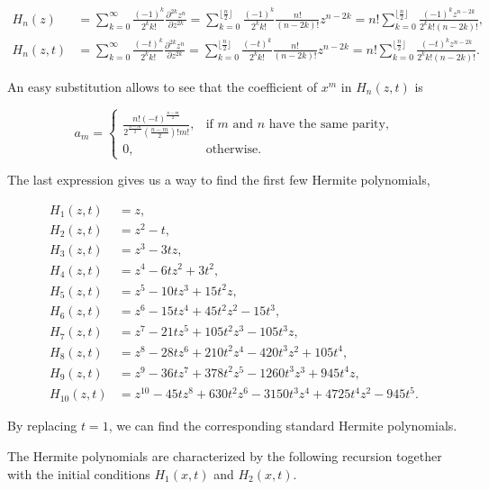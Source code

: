 \begin{align*}
    H_n(z) &= \sum_{k=0}^\infty \frac{(-1)^k}{2^k k!} \frac{\partial^{2k} z^n}{\partial z^{2k}} = \sum_{k=0}^{\lfloor \frac n2 \rfloor} \frac{(-1)^k}{2^k k!} \frac{n! }{(n-2k)!}z^{n-2k} = n! \sum_{k=0}^{\lfloor \frac n2\rfloor} \frac{(-1)^k z^{n-2k}}{2^k k! (n-2k)!}, \\
    H_n(z,t) &= \sum_{k=0}^\infty \frac{(-t)^k}{2^k k!} \frac{\partial^{2k} z^n}{\partial z^{2k}} = \sum_{k=0}^{\lfloor \frac n2 \rfloor} \frac{(-t)^k}{2^k k!} \frac{n! }{(n-2k)!}z^{n-2k} = n! \sum_{k=0}^{\lfloor \frac n2\rfloor} \frac{(-t)^k z^{n-2k}}{2^k k! (n-2k)!}.
\end{align*}

An easy substitution allows to see that the coefficient of $x^m$ in $H_n(z,t)$ is 

\begin{equation}
    a_m = \left\{ \begin{array}{cc}
        \frac{n!(-t)^{\frac{n-m}2}}{2^{\frac{n-m}{2}}\left( \frac{n-m}{2}\right)!m!}, &  \text{if $m$ and $n$ have the same parity,} \\
        0, & \text{otherwise}.
    \end{array} \right.
\end{equation}


The last expression gives us a way to find the first few Hermite polynomials,

\begin{align*}
    H_1(z,t) &= z,\\
    H_2(z,t) &= z^2 - t, \\
    H_3(z,t) &= z^3 - 3tz,\\ 
    H_4(z,t) &= z^4 - 6tz^2 + 3t^2,\\ 
    H_5(z,t) &= z^5 - 10tz^3 + 15t^2z,\\ 
    H_6(z,t) &= z^6 - 15tz^4 + 45 t^2 z^2 - 15t^3,\\ 
    H_7(z,t) &= z^7 - 21tz^5 + 105t^2z^3 -105t^3z,\\ 
    H_8(z,t) &= z^8 - 28tz^6 + 210t^2z^4 - 420t^3z^2 + 105t^4,\\ 
    H_9(z,t) &= z^9 - 36tz^7 + 378t^2z^5 - 1260t^3z^3 + 945t^4z,\\ 
    H_{10}(z,t) &= z^{10} - 45tz^8 + 630t^2z^6 - 3150t^3z^4 + 4725t^4z^2 - 945t^5.
\end{align*}

By replacing $t=1$, we can find the corresponding standard Hermite polynomials.

The Hermite polynomials are characterized by the following recursion together with the initial conditions $H_1(x,t)$ and $H_2(x,t)$.

